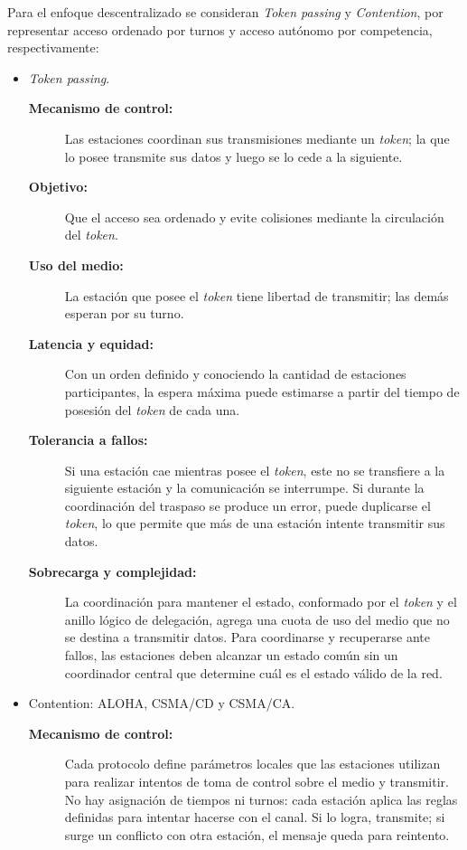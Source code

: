 \documentclass[11pt,a4paper]{article}
\begin{document}
Para el enfoque descentralizado se consideran \textit{Token passing} y \textit{Contention}, por representar acceso ordenado por turnos y acceso autónomo por competencia, respectivamente:
\begin{itemize}
  \item \textit{Token passing}.
  \begin{description}
    \item[\textbf{Mecanismo de control:}] Las estaciones coordinan sus transmisiones mediante un \textit{token}; la que lo posee transmite sus datos y luego se lo cede a la siguiente.
    \item[\textbf{Objetivo:}] Que el acceso sea ordenado y evite colisiones mediante la circulación del \textit{token}.
    \item[\textbf{Uso del medio:}] La estación que posee el \textit{token} tiene libertad de transmitir; las demás esperan por su turno.
    \item[\textbf{Latencia y equidad:}] Con un orden definido y conociendo la cantidad de estaciones participantes, la espera máxima puede estimarse a partir del tiempo de posesión del \textit{token} de cada una.
    \item[\textbf{Tolerancia a fallos:}] Si una estación cae mientras posee el \textit{token}, este no se transfiere a la siguiente estación y la comunicación se interrumpe. Si durante la coordinación del traspaso se produce un error, puede duplicarse el \textit{token}, lo que permite que más de una estación intente transmitir sus datos.
    \item[\textbf{Sobrecarga y complejidad:}] La coordinación para mantener el estado, conformado por el \textit{token} y el anillo lógico de delegación, agrega una cuota de uso del medio que no se destina a transmitir datos. Para coordinarse y recuperarse ante fallos, las estaciones deben alcanzar un estado común sin un coordinador central que determine cuál es el estado válido de la red.
  \end{description}
  \item Contention: ALOHA, CSMA/CD y CSMA/CA.
  \begin{description}
    \item[\textbf{Mecanismo de control:}] Cada protocolo define parámetros locales que las estaciones utilizan para realizar intentos de toma de control sobre el medio y transmitir. No hay asignación de tiempos ni turnos: cada estación aplica las reglas definidas para intentar hacerse con el canal. Si lo logra, transmite; si surge un conflicto con otra estación, el mensaje queda para reintento.

\end{description}
\end{itemize}
\end{document}
